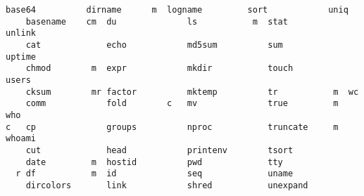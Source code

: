 \begin{minipage}{\linewidth}
\PreTable
\begin{lstlisting}[label={lst:coreutils},caption={GNU Core Utilities tested; those which crashed are indicated with a letter to their left (\texttt{c} = \texttt{calloc}, \texttt{m} = \texttt{malloc}, \texttt{r} = \texttt{realloc}). A total of 13/51 (25.5\%) crashed for at least one call.}]
    base64          dirname      m  logname         sort            uniq
    basename    cm  du              ls           m  stat            unlink
    cat             echo            md5sum          sum             uptime
    chmod        m  expr            mkdir           touch           users
    cksum        mr factor          mktemp          tr           m  wc
    comm            fold        c   mv              true         m  who
c   cp              groups          nproc           truncate     m  whoami
    cut             head            printenv        tsort
    date         m  hostid          pwd             tty
  r df           m  id              seq             uname
    dircolors       link            shred           unexpand
\end{lstlisting}
\PostTable
\end{minipage}
